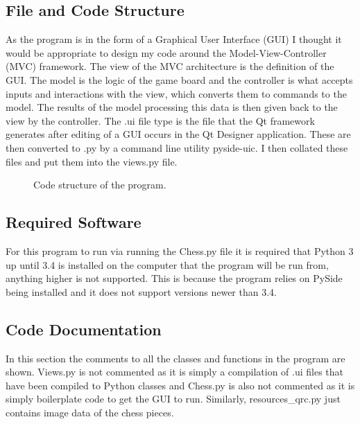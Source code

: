 \documentclass[twoside, 12pt]{report}
\begin{document}
\subsection{File and Code Structure}
As the program is in the form of a Graphical User Interface (GUI) I thought it would be appropriate to design my code around the Model-View-Controller (MVC) framework. The view of the MVC architecture is the definition of the GUI. The model is the logic of the game board and the controller is what accepts inputs and interactions with the view, which converts them to commands to the model. The results of the model processing this data is then given back to the view by the controller. The .ui file type is the file that the Qt framework generates after editing of a GUI occurs in the Qt Designer application. These are then converted to .py by a command line utility pyside-uic. I then collated these files and put them into the views.py file.
\begin{figure}[H]
	\caption{Code structure of the program.}
\end{figure}
\subsection{Required Software}
For this program to run via running the Chess.py file it is required that Python 3 up until 3.4 is installed on the computer that the program will be run from, anything higher is not supported. This is because the program relies on PySide being installed and it does not support versions newer than 3.4. 
\subsection{Code Documentation}
In this section the comments to all the classes and functions in the program are shown. Views.py is not commented as it is simply a compilation of .ui files that have been compiled to Python classes and Chess.py is also not commented as it is simply boilerplate code to get the GUI to run. Similarly, resources{\_}qrc.py just contains image data of the chess pieces.
\end{document}
